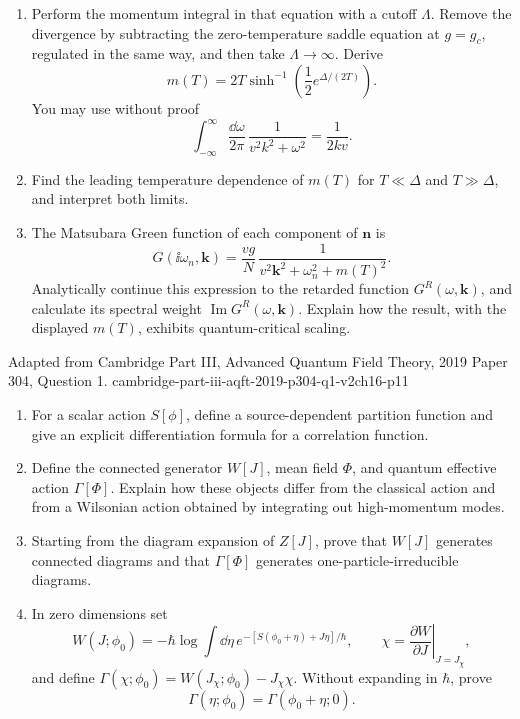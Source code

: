 \begin{enumerate}
\begin{enumerate}
    \item[(e)]
    Perform the momentum integral in that equation with a cutoff
    \(\Lambda\).  Remove the divergence by subtracting the zero-temperature
    saddle equation at \(g=g_c\), regulated in the same way, and then take
    \(\Lambda\to\infty\).  Derive
    \[
      m(T)=2T\sinh^{-1}\!\left(\frac12e^{\Delta/(2T)}\right).
    \]
    You may use without proof
    \[
      \int_{-\infty}^{\infty}\frac{\dd\omega}{2\pi}\,
        \frac1{v^2k^2+\omega^2}=\frac1{2kv}.
    \]
    \item[(f)]
    Find the leading temperature dependence of \(m(T)\) for
    \(T\ll\Delta\) and \(T\gg\Delta\), and interpret both limits.
    \item[(g)]
    The Matsubara Green function of each component of \(\mathbf n\) is
    \[
      G(\ii\omega_n,\mathbf k)
        =\frac{vg}{N}\,
          \frac1{v^2\mathbf k^2+\omega_n^2+m(T)^2}.
    \]
    Analytically continue this expression to the retarded function
    \(G^R(\omega,\mathbf k)\), and calculate its spectral weight
    \(\operatorname{Im}G^R(\omega,\mathbf k)\).  Explain how the result, with
    the displayed \(m(T)\), exhibits quantum-critical scaling.
  \end{enumerate}

  {Adapted from Cambridge Part III, Advanced Quantum Field Theory, 2019 Paper 304, Question 1.}
  {cambridge-part-iii-aqft-2019-p304-q1-v2ch16-p11}
  \begin{enumerate}
    \item[(a)] For a scalar action \(S[\phi]\), define a source-dependent
      partition function and give an explicit differentiation formula for
      a correlation function.
    \item[(b)] Define the connected generator \(W[J]\), mean field
      \(\Phi\), and quantum effective action \(\Gamma[\Phi]\).  Explain how
      these objects differ from the classical action and from a Wilsonian
      action obtained by integrating out high-momentum modes.
    \item[(c)] Starting from the diagram expansion of \(Z[J]\), prove that
      \(W[J]\) generates connected diagrams and that \(\Gamma[\Phi]\)
      generates one-particle-irreducible diagrams.
    \item[(d)] In zero dimensions set
      \[
        W(J;\phi_0)=-\hbar\log\int \dd\eta\,
        e^{-[S(\phi_0+\eta)+J\eta]/\hbar},\qquad
        \chi=\left.\frac{\partial W}{\partial J}\right|_{J=J_\chi},
      \]
      and define \(\Gamma(\chi;\phi_0)=W(J_\chi;\phi_0)-J_\chi\chi\).
      Without expanding in \(\hbar\), prove
      \[
        \Gamma(\eta;\phi_0)=\Gamma(\phi_0+\eta;0).
      \]
  \end{enumerate}

\end{enumerate}
